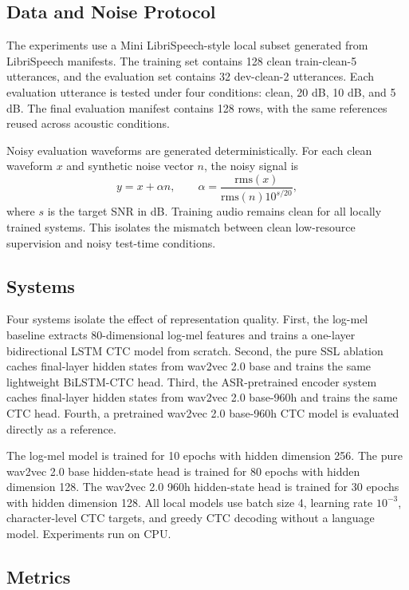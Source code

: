\documentclass{article}
\begin{document}
\subsection{Data and Noise Protocol}
\label{ssec:data}

The experiments use a Mini LibriSpeech-style local subset generated from LibriSpeech manifests. The training set contains 128 clean train-clean-5 utterances, and the evaluation set contains 32 dev-clean-2 utterances. Each evaluation utterance is tested under four conditions: clean, 20 dB, 10 dB, and 5 dB. The final evaluation manifest contains 128 rows, with the same references reused across acoustic conditions.

Noisy evaluation waveforms are generated deterministically. For each clean waveform $x$ and synthetic noise vector $n$, the noisy signal is
\begin{equation}
    y = x + \alpha n,\qquad
    \alpha = \frac{\mathrm{rms}(x)}{\mathrm{rms}(n)10^{s/20}},
\end{equation}
where $s$ is the target SNR in dB. Training audio remains clean for all locally trained systems. This isolates the mismatch between clean low-resource supervision and noisy test-time conditions.

\subsection{Systems}
\label{ssec:systems}

Four systems isolate the effect of representation quality. First, the log-mel baseline extracts 80-dimensional log-mel features and trains a one-layer bidirectional LSTM CTC model from scratch. Second, the pure SSL ablation caches final-layer hidden states from wav2vec 2.0 base and trains the same lightweight BiLSTM-CTC head. Third, the ASR-pretrained encoder system caches final-layer hidden states from wav2vec 2.0 base-960h and trains the same CTC head. Fourth, a pretrained wav2vec 2.0 base-960h CTC model is evaluated directly as a reference.

The log-mel model is trained for 10 epochs with hidden dimension 256. The pure wav2vec 2.0 base hidden-state head is trained for 80 epochs with hidden dimension 128. The wav2vec 2.0 960h hidden-state head is trained for 30 epochs with hidden dimension 128. All local models use batch size 4, learning rate $10^{-3}$, character-level CTC targets, and greedy CTC decoding without a language model. Experiments run on CPU.

\subsection{Metrics}
\label{ssec:metrics}
\end{document}
